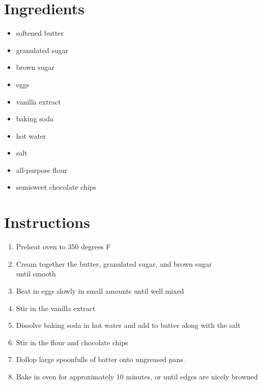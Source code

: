 \documentclass[]{article}
\begin{document}
\maketitle
\section*{Ingredients}
\begin{itemize}
\item softened butter
\item granulated sugar
\item brown sugar
\item eggs
\item vanilla extract
\item baking soda
\item hot water
\item salt
\item all-purpose flour
\item semisweet chocolate chips
\end{itemize}
\vspace{\baselineskip}
\section*{Instructions}
\begin{enumerate}
\item Preheat oven to 350 degrees F
\item Cream together the butter, granulated sugar, and brown sugar\\
until smooth
\item Beat in eggs slowly in small amounts until well mixed
\item Stir in the vanilla extract
\item Dissolve baking soda in hot water and add to batter along with the salt
\item Stir in the flour and chocolate chips
\item Dollop large spoonfulls of batter onto ungreased pans.
\item Bake in oven for approximately 10 minutes, or until edges are nicely browned
\end{enumerate}
\end{document}
